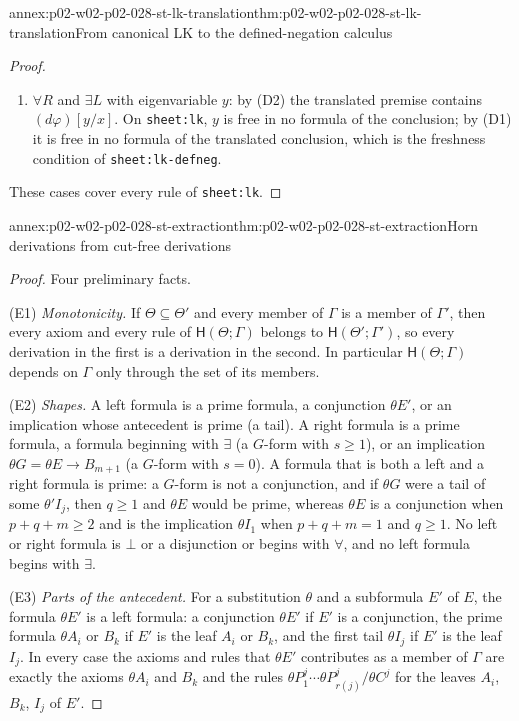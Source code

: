\begin{annexitem}{annex:p02-w02-p02-028-st-lk-translation}{thm:p02-w02-p02-028-st-lk-translation}{From canonical LK to the defined-negation calculus}
\begin{proof}
\begin{enumerate}
  \item \(\forall R\) and \(\exists L\) with eigenvariable \(y\): by (D2) the
        translated premise contains \((d\varphi)[y/x]\).  On
        \texttt{sheet:lk}, \(y\) is free in no formula of the conclusion; by
        (D1) it is free in no formula of the translated conclusion, which is
        the freshness condition of \texttt{sheet:lk-defneg}.
\end{enumerate}
These cases cover every rule of \texttt{sheet:lk}.
\end{proof}
\end{annexitem}

\begin{annexitem}{annex:p02-w02-p02-028-st-extraction}{thm:p02-w02-p02-028-st-extraction}{Horn derivations from cut-free derivations}
\begin{proof}
Four preliminary facts.

(E1) \emph{Monotonicity.}  If \(\Theta\subseteq\Theta'\) and every member of
\(\Gamma\) is a member of \(\Gamma'\), then every axiom and every rule of
\(\mathsf H(\Theta;\Gamma)\) belongs to \(\mathsf H(\Theta';\Gamma')\), so
every derivation in the first is a derivation in the second.  In particular
\(\mathsf H(\Theta;\Gamma)\) depends on \(\Gamma\) only through the set of
its members.

(E2) \emph{Shapes.}  A left formula is a prime formula, a conjunction
\(\theta E'\), or an implication whose antecedent is prime (a tail).  A right
formula is a prime formula, a formula beginning with \(\exists\) (a
\(G\)-form with \(s\geq1\)), or an implication \(\theta G=\theta E\to
B_{m+1}\) (a \(G\)-form with \(s=0\)).  A formula that is both a left and a
right formula is prime: a \(G\)-form is not a conjunction, and if
\(\theta G\) were a tail of some \(\theta'I_j\), then \(q\geq1\) and
\(\theta E\) would be prime, whereas \(\theta E\) is a conjunction when
\(p+q+m\geq2\) and is the implication \(\theta I_1\) when \(p+q+m=1\) and
\(q\geq1\).  No left or right formula is \(\bot\) or a disjunction or begins
with \(\forall\), and no left formula begins with \(\exists\).

(E3) \emph{Parts of the antecedent.}  For a substitution \(\theta\) and a
subformula \(E'\) of \(E\), the formula \(\theta E'\) is a left formula: a
conjunction \(\theta E'\) if \(E'\) is a conjunction, the prime formula
\(\theta A_i\) or \(B_k\) if \(E'\) is the leaf \(A_i\) or \(B_k\), and the
first tail \(\theta I_j\) if \(E'\) is the leaf \(I_j\).  In every case the
axioms and rules that \(\theta E'\) contributes as a member of \(\Gamma\) are
exactly the axioms \(\theta A_i\) and \(B_k\) and the rules
\(\theta P^j_1\cdots\theta P^j_{r(j)}/\theta C^j\) for the leaves
\(A_i\), \(B_k\), \(I_j\) of \(E'\).


\end{proof}
\end{annexitem}
